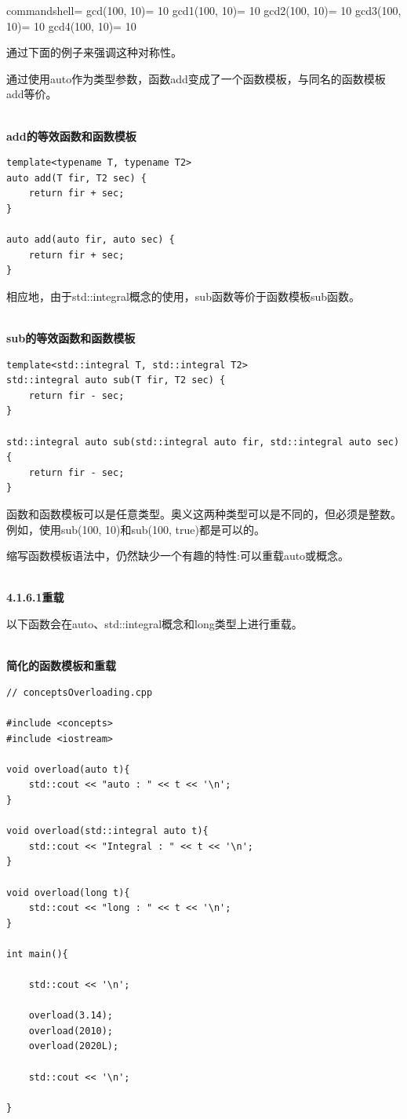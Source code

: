 \begin{tcblisting}{commandshell={}}
gcd(100, 10)= 10
gcd1(100, 10)= 10
gcd2(100, 10)= 10
gcd3(100, 10)= 10
gcd4(100, 10)= 10
\end{tcblisting}

通过下面的例子来强调这种对称性。

通过使用auto作为类型参数，函数add变成了一个函数模板，与同名的函数模板add等价。

\hspace*{\fill} \\ %
\noindent
\textbf{add的等效函数和函数模板}
\begin{lstlisting}[style=styleCXX]
template<typename T, typename T2>
auto add(T fir, T2 sec) {
	return fir + sec;
}

auto add(auto fir, auto sec) {
	return fir + sec;
}
\end{lstlisting}

相应地，由于std::integral概念的使用，sub函数等价于函数模板sub函数。

\hspace*{\fill} \\ %
\noindent
\textbf{sub的等效函数和函数模板}
\begin{lstlisting}[style=styleCXX]
template<std::integral T, std::integral T2>
std::integral auto sub(T fir, T2 sec) {
	return fir - sec;
}

std::integral auto sub(std::integral auto fir, std::integral auto sec) {
	return fir - sec;
}
\end{lstlisting}

函数和函数模板可以是任意类型。奥义这两种类型可以是不同的，但必须是整数。例如，使用sub(100, 10)和sub(100, true)都是可以的。

缩写函数模板语法中，仍然缺少一个有趣的特性:可以重载auto或概念。

\hspace*{\fill} \\ %
\noindent
\textbf{4.1.6.1\hspace{0.2cm}重载}

以下函数会在auto、std::integral概念和long类型上进行重载。

\hspace*{\fill} \\ %
\noindent
\textbf{简化的函数模板和重载}
\begin{lstlisting}[style=styleCXX]
// conceptsOverloading.cpp

#include <concepts>
#include <iostream>

void overload(auto t){
	std::cout << "auto : " << t << '\n';
}

void overload(std::integral auto t){
	std::cout << "Integral : " << t << '\n';
}

void overload(long t){
	std::cout << "long : " << t << '\n';
}

int main(){

	std::cout << '\n';
	
	overload(3.14);
	overload(2010);
	overload(2020L);
	
	std::cout << '\n';

}
\end{lstlisting}

